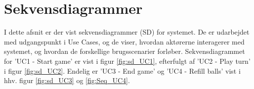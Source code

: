\documentclass[Arkitektur/System_main.tex]{subfiles}
\begin{document}
\section{Sekvensdiagrammer}

I dette afsnit er der vist sekvensdiagrammer (SD) for systemet. De er udarbejdet med udgangspunkt i Use Cases, og de viser, hvordan aktørerne interagerer med systemet, og hvordan de forskellige brugsscenarier forløber. Sekvensdiagrammet for 'UC1 - Start game' er vist i figur \ref{fig:sd_UC1}, efterfulgt af 'UC2 - Play turn' i figur \ref{fig:sd_UC2}. Endelig er 'UC3 - End game' og 'UC4 - Refill balls' vist i hhv. figur \ref{fig:sd_UC3} og \ref{fig:Seq_UC4}.





\end{document}
